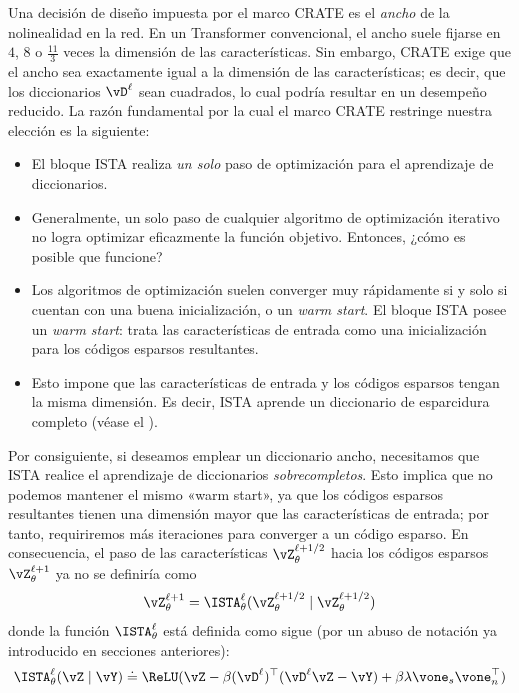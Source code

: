 \documentclass[../../book-main_es.tex]{subfiles}
\begin{document}
Una decisión de diseño impuesta por el marco CRATE es el
\textit{ancho} de la nolinealidad en la red. En un Transformer
convencional, el ancho suele fijarse en \(4\), \(8\) o
\(\frac{11}{3}\) veces la dimensión de las características. Sin embargo, CRATE exige
que el ancho sea exactamente igual a la dimensión de las características; es decir, que los
diccionarios \(\vD^{\ell}\) sean cuadrados, lo cual podría resultar en un desempeño reducido.
La razón fundamental por la cual el marco CRATE
restringe nuestra elección es la siguiente:
\begin{itemize}
\item El bloque ISTA realiza \textit{un solo} paso de optimización para
el aprendizaje de diccionarios.
\item Generalmente, un solo paso de cualquier algoritmo de optimización iterativo no logra
optimizar eficazmente la función objetivo. Entonces, ¿cómo es posible que funcione?
\item Los algoritmos de optimización suelen converger muy rápidamente si y
solo si cuentan con una buena inicialización, o un \textit{warm start}. El
bloque ISTA posee un \textit{warm start}: trata las características de entrada como una
inicialización para los códigos esparsos resultantes.
\item Esto impone que las características de entrada y los códigos esparsos tengan la
misma dimensión. Es decir, ISTA aprende un diccionario de esparcidura completo
(véase el ).
\end{itemize}
Por consiguiente, si deseamos emplear un diccionario ancho, necesitamos que ISTA realice
el aprendizaje de diccionarios \textit{sobrecompletos}. Esto implica que no podemos mantener
el mismo «warm start», ya que los códigos esparsos resultantes tienen una dimensión mayor que
las características de entrada; por tanto, requiriremos más iteraciones para converger a un código esparso.
En consecuencia, el paso de las características \(\vZ_{\theta}^{\ell + 1/2}\) hacia los códigos esparsos
\(\vZ_{\theta}^{\ell + 1}\) ya no se definiría como
\begin{equation}
\vZ_{\theta}^{\ell + 1} = \ISTA_{\theta}^{\ell}(\vZ_{\theta}^{\ell +
1/2} \mid \vZ_{\theta}^{\ell + 1/2})
\end{equation}
donde la función \(\ISTA_{\theta}^{\ell}\) está definida como sigue (por 
un abuso de notación ya introducido en secciones anteriores):
\begin{equation}
\ISTA_{\theta}^{\ell}(\vZ \mid \vY) \doteq \ReLU(\vZ - \beta
(\vD^{\ell})^{\top}(\vD^{\ell}\vZ - \vY) + \beta \lambda
\vone_{s}\vone_{n}^{\top})
\end{equation}
\end{document}
